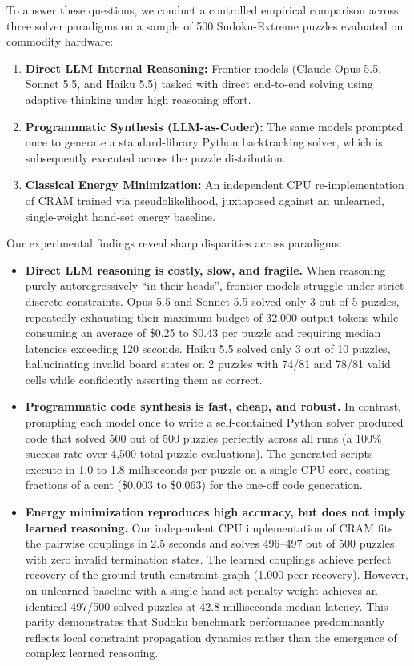 \documentclass{article} %
\begin{document}
To answer these questions, we conduct a controlled empirical comparison across three solver paradigms on a sample of 500 Sudoku-Extreme puzzles evaluated on commodity hardware:
\begin{enumerate}
    \item \textbf{Direct LLM Internal Reasoning:} Frontier models (Claude Opus 5.5, Sonnet 5.5, and Haiku 5.5) tasked with direct end-to-end solving using adaptive thinking under high reasoning effort.
    \item \textbf{Programmatic Synthesis (LLM-as-Coder):} The same models prompted once to generate a standard-library Python backtracking solver, which is subsequently executed across the puzzle distribution.
    \item \textbf{Classical Energy Minimization:} An independent CPU re-implementation of CRAM trained via pseudolikelihood, juxtaposed against an unlearned, single-weight hand-set energy baseline.
\end{enumerate}

Our experimental findings reveal sharp disparities across paradigms:
\begin{itemize}
    \item \textbf{Direct LLM reasoning is costly, slow, and fragile.} When reasoning purely autoregressively ``in their heads'', frontier models struggle under strict discrete constraints. Opus 5.5 and Sonnet 5.5 solved only 3 out of 5 puzzles, repeatedly exhausting their maximum budget of 32,000 output tokens while consuming an average of \$0.25 to \$0.43 per puzzle and requiring median latencies exceeding 120 seconds. Haiku 5.5 solved only 3 out of 10 puzzles, hallucinating invalid board states on 2 puzzles with 74/81 and 78/81 valid cells while confidently asserting them as correct.
    \item \textbf{Programmatic code synthesis is fast, cheap, and robust.} In contrast, prompting each model once to write a self-contained Python solver produced code that solved 500 out of 500 puzzles perfectly across all runs (a 100\% success rate over 4,500 total puzzle evaluations). The generated scripts execute in 1.0 to 1.8 milliseconds per puzzle on a single CPU core, costing fractions of a cent (\$0.003 to \$0.063) for the one-off code generation.
    \item \textbf{Energy minimization reproduces high accuracy, but does not imply learned reasoning.} Our independent CPU implementation of CRAM fits the pairwise couplings in 2.5 seconds and solves 496--497 out of 500 puzzles with zero invalid termination states. The learned couplings achieve perfect recovery of the ground-truth constraint graph (1.000 peer recovery). However, an unlearned baseline with a single hand-set penalty weight achieves an identical 497/500 solved puzzles at 42.8 milliseconds median latency. This parity demonstrates that Sudoku benchmark performance predominantly reflects local constraint propagation dynamics rather than the emergence of complex learned reasoning.
\end{itemize}
\end{document}
